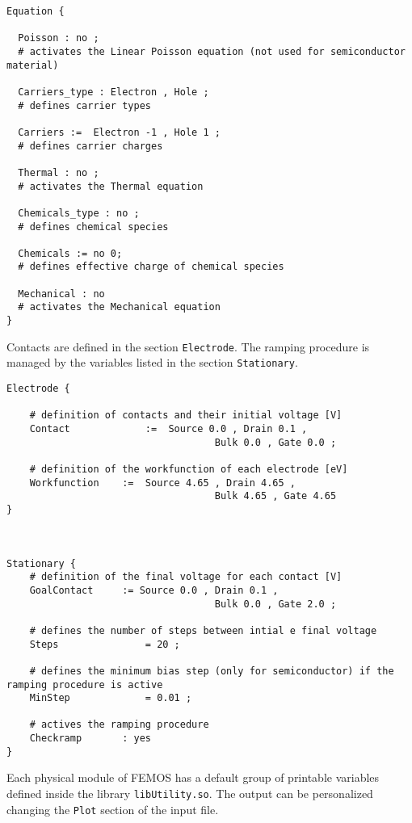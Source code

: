 \begin{lstlisting}[style = general]
Equation {

  Poisson : no ;
  # activates the Linear Poisson equation (not used for semiconductor material)
  
  Carriers_type : Electron , Hole ;
  # defines carrier types
  
  Carriers :=  Electron -1 , Hole 1 ;
  # defines carrier charges 

  Thermal : no ;
  # activates the Thermal equation
  
  Chemicals_type : no ;
  # defines chemical species
  
  Chemicals := no 0;
  # defines effective charge of chemical species

  Mechanical : no
  # activates the Mechanical equation
}
\end{lstlisting}

\vspace{0.5cm}
Contacts are defined in the section \texttt{Electrode}. The ramping procedure is managed by the variables listed in the section \texttt{Stationary}.
\vspace{0.5cm}
\begin{lstlisting}[style = general]
Electrode {

	# definition of contacts and their initial voltage [V]
	Contact 			:=	Source 0.0 , Drain 0.1 ,
									Bulk 0.0 , Gate 0.0 ;
	
	# definition of the workfunction of each electrode [eV]
	Workfunction	:=	Source 4.65 , Drain 4.65 ,
									Bulk 4.65 , Gate 4.65 
}



Stationary {
	# definition of the final voltage for each contact [V]
	GoalContact		:= Source 0.0 , Drain 0.1 ,
									Bulk 0.0 , Gate 2.0 ;

	# defines the number of steps between intial e final voltage
	Steps 				= 20 ;
	
	# defines the minimum bias step (only for semiconductor) if the ramping procedure is active
	MinStep 			= 0.01 ;

	# actives the ramping procedure
	Checkramp 		: yes
}
\end{lstlisting}

\vspace{0.5cm}
Each physical module of FEMOS has a default group of printable variables defined inside the library \texttt{libUtility.so}. The output can be personalized changing the \texttt{Plot} section of the input file.
\vspace{0.5cm}


